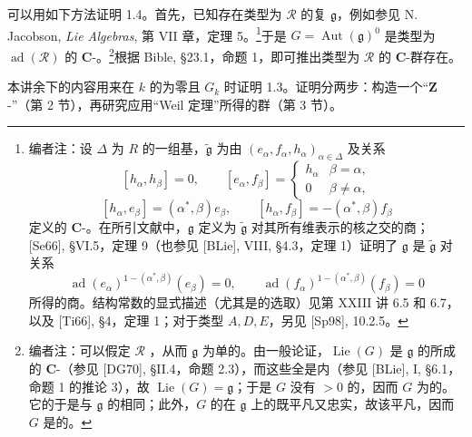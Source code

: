 可以用如下方法证明 1.4。首先，已知存在类型为 $\mathcal R$ 的复 $\mathfrak g$，例如参见 N. Jacobson, \emph{Lie Algebras}, 第 VII 章，定理 5。\footnote{编者注：设 $\Delta$ 为 $R$ 的一组基，$\widetilde{\mathfrak g}$ 为由 $(e_\alpha,f_\alpha,h_\alpha)_{\alpha\in\Delta}$ 及关系
\[
[h_\alpha,h_\beta]=0,\qquad
[e_\alpha,f_\beta]=\begin{cases}h_\alpha&\beta=\alpha,\\0&\beta\ne\alpha,\end{cases}
\]
\[
[h_\alpha,e_\beta]=(\alpha^*,\beta)e_\beta,\qquad
[h_\alpha,f_\beta]=-(\alpha^*,\beta)f_\beta
\]
定义的 $\mathbf C$-。在所引文献中，$\mathfrak g$ 定义为 $\widetilde{\mathfrak g}$ 对其所有维表示的核之交的商；[Se66], \S VI.5，定理 9（也参见 [BLie], VIII, \S 4.3，定理 1）证明了 $\mathfrak g$ 是 $\widetilde{\mathfrak g}$ 对关系
\[
\operatorname{ad}(e_\alpha)^{1-(\alpha^*,\beta)}(e_\beta)=0,
\qquad
\operatorname{ad}(f_\alpha)^{1-(\alpha^*,\beta)}(f_\beta)=0
\]
所得的商。结构常数的显式描述（尤其是的选取）见第 XXIII 讲 6.5 和 6.7，以及 [Ti66], \S 4，定理 1；对于类型 $A,D,E$，另见 [Sp98], 10.2.5。}于是 $G=\operatorname{Aut}(\mathfrak g)^0$ 是类型为 $\operatorname{ad}(\mathcal R)$ 的 $\mathbf C$-。\footnote{编者注：可以假定 $\mathcal R$ ，从而 $\mathfrak g$ 为单的。由一般论证，$\operatorname{Lie}(G)$ 是 $\mathfrak g$ 的所成的 $\mathbf C$-（参见 [DG70], \S II.4，命题 2.3），而这些全是内（参见 [BLie], I, \S 6.1，命题 1 的推论 3），故 $\operatorname{Lie}(G)=\mathfrak g$；于是 $G$ 没有 $>0$ 的，因而 $G$ 为的。它的于是与 $\mathfrak g$ 的相同；此外，$G$ 的在 $\mathfrak g$ 上的既平凡又忠实，故该平凡，因而 $G$ 是的。}根据 Bible, \S 23.1，命题 1，即可推出类型为 $\mathcal R$ 的 $\mathbf C$-群存在。

本讲余下的内容用来在 $k$ 的为零且 $G_k$ 时证明 1.3。证明分两步：构造一个“$\mathbf Z$-”（第 2 节），再研究应用“Weil 定理”所得的群（第 3 节）。

